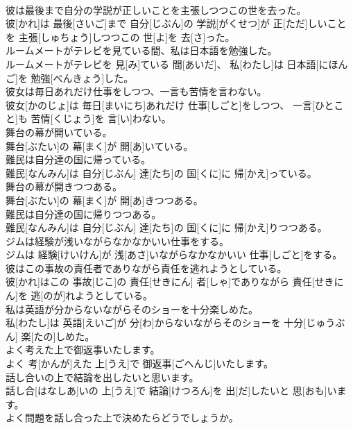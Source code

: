 \documentclass[8pt]{extreport}
\begin{document}
\begin{CJK}{UTF8}{min}
\\	彼は最後まで自分の学説が正しいことを主張しつつこの世を去った。	
\\	彼[かれ]は 最後[さいご]まで 自分[じぶん]の 学説[がくせつ]が 正[ただ]しいことを 主張[しゅちょう]しつつこの 世[よ]を 去[さ]った。
\\	ルームメートがテレビを見ている間、私は日本語を勉強した。	
\\	ルームメートがテレビを 見[み]ている 間[あいだ]、 私[わたし]は 日本語[にほんご]を 勉強[べんきょう]した。
\\	彼女は毎日あれだけ仕事をしつつ、一言も苦情を言わない。	
\\	彼女[かのじょ]は 毎日[まいにち]あれだけ 仕事[しごと]をしつつ、 一言[ひとこと]も 苦情[くじょう]を 言[い]わない。
\\	舞台の幕が開いている。	
\\	舞台[ぶたい]の 幕[まく]が 開[あ]いている。
\\	難民は自分達の国に帰っている。	
\\	難民[なんみん]は 自分[じぶん] 達[たち]の 国[くに]に 帰[かえ]っている。
\\	舞台の幕が開きつつある。	
\\	舞台[ぶたい]の 幕[まく]が 開[あ]きつつある。
\\	難民は自分達の国に帰りつつある。	
\\	難民[なんみん]は 自分[じぶん] 達[たち]の 国[くに]に 帰[かえ]りつつある。
\\	ジムは経験が浅いながらなかなかいい仕事をする。	
\\	ジムは 経験[けいけん]が 浅[あさ]いながらなかなかいい 仕事[しごと]をする。
\\	彼はこの事故の責任者でありながら責任を逃れようとしている。	
\\	彼[かれ]はこの 事故[じこ]の 責任[せきにん] 者[しゃ]でありながら 責任[せきにん]を 逃[のが]れようとしている。
\\	私は英語が分からないながらそのショーを十分楽しめた。	
\\	私[わたし]は 英語[えいご]が 分[わ]からないながらそのショーを 十分[じゅうぶん] 楽[たの]しめた。
\\	よく考えた上で御返事いたします。	
\\	よく 考[かんが]えた 上[うえ]で 御返事[ごへんじ]いたします。
\\	話し合いの上で結論を出したいと思います。	
\\	話し合[はなしあ]いの 上[うえ]で 結論[けつろん]を 出[だ]したいと 思[おも]います。
\\	よく問題を話し合った上で決めたらどうでしょうか。	

\end{CJK}
\end{document}
